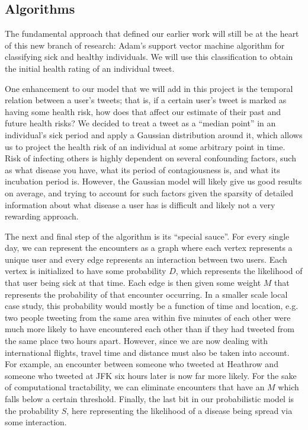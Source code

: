 \documentclass[11pt, letterpaper]{article}
\begin{document}
        \subsection{Algorithms}
            The fundamental approach that defined our earlier work will still be at the heart of this new branch of research: Adam's support vector machine algorithm for classifying sick and healthy individuals. We will use this classification to obtain the initial health rating of an individual tweet.

            One enhancement to our model that we will add in this project is the temporal relation between a user's tweets; that is, if a certain user's tweet is marked as having some health risk, how does that affect our estimate of their past and future health risks? We decided to treat a tweet as a ``median point'' in an individual's sick period and apply a Gaussian distribution around it, which allows us to project the health risk of an individual at some arbitrary point in time. Risk of infecting others is highly dependent on several confounding factors, such as what disease you have, what its period of contagiousness is, and what its incubation period is. However, the Gaussian model will likely give us good results on average, and trying to account for such factors given the sparsity of detailed information about what disease a user has is difficult and likely not a very rewarding approach.

            The next and final step of the algorithm is its ``special sauce''. For every single day, we can represent the encounters as a graph where each vertex represents a unique user and every edge represents an interaction between two users. Each vertex is initialized to have some probability $D$, which represents the likelihood of that user being sick at that time. Each edge is then given some weight $M$ that represents the probability of that encounter occurring. In a smaller scale local case study, this probability would mostly be a function of time and location, e.g. two people tweeting from the same area within five minutes of each other were much more likely to have encountered each other than if they had tweeted from the same place two hours apart. However, since we are now dealing with international flights, travel time and distance must also be taken into account. For example, an encounter between someone who tweeted at Heathrow and someone who tweeted at JFK six hours later is now far more likely. For the sake of computational tractability, we can eliminate encounters that have an $M$ which falls below a certain threshold. Finally, the last bit in our probabilistic model is the probability $S$, here representing the likelihood of a disease being spread via some interaction.
\end{document}
